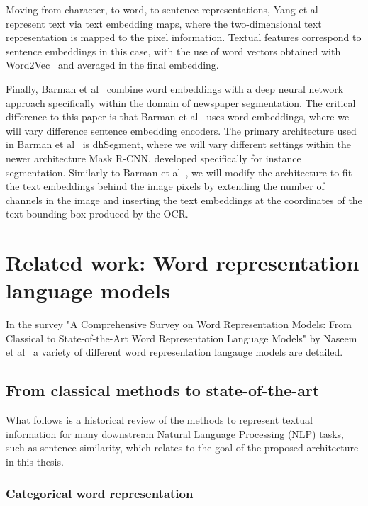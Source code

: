 \documentclass[oneside, english, bibtex]{kththesis}
\begin{document}
Moving from character, to word, to sentence representations, Yang et al~\cite{DBLP:journals/corr/YangYAKKG17} represent text via text embedding maps, where the two-dimensional text representation is mapped to the pixel information. Textual features correspond to sentence embeddings in this case, with the use of word vectors obtained with Word2Vec~\cite{mikolov2013} and averaged in the final embedding.

Finally, Barman et al~\cite{jdmdh:7097} combine word embeddings with a deep neural network approach specifically within the domain of newspaper segmentation. The critical difference to this paper is that Barman et al~\cite{jdmdh:7097} uses word embeddings, where we will vary difference sentence embedding encoders. The primary architecture used in Barman et al~\cite{jdmdh:7097} is dhSegment, where we will vary different settings within the newer architecture Mask R-CNN, developed specifically for instance segmentation. Similarly to Barman et al~\cite{jdmdh:7097}, we will modify the architecture to fit the text embeddings behind the image pixels by extending the number of channels in the image and inserting the text embeddings at the coordinates of the text bounding box produced by the OCR.

\section{Related work: Word representation language models}
\label{sec:langrep}

In the survey "A Comprehensive Survey on Word Representation Models: From Classical to State-of-the-Art Word Representation Language Models" by Naseem et al~\cite{10.1145/3434237} a variety of different word representation langauge models are detailed.

\subsection{From classical methods to state-of-the-art}

What follows is a historical review of the methods to represent textual information for many downstream Natural Language Processing (NLP) tasks, such as sentence similarity, which relates to the goal of the proposed architecture in this thesis. 

\subsubsection{Categorical word representation}
\end{document}
